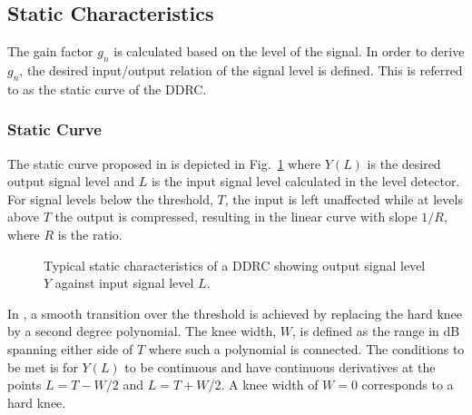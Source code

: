 \documentclass[../main2.tex]{subfiles}
\providecommand{\rootdir}{..}
\begin{document}
\FloatBarrier
\subsection{Static Characteristics}
The gain factor $g_n$ is calculated based on the level of the signal. In order to derive $g_n$, the desired input/output relation of the signal level is defined. This is referred to as the static curve of the DDRC.

\subsubsection{Static Curve}
The static curve proposed in \cite{mcnally1984dynamic, stikvoort1986digital, frindle1996implementation, reiss2012tutorial} is depicted in Fig.~\ref{fig:typical_static_detailed} where $Y(L)$ is the desired output signal level and $L$ is the input signal level calculated in the level detector. For signal levels below the threshold, $T$, the input is left unaffected while at levels above $T$ the output is compressed, resulting in the linear curve with slope $1/R$, where $R$ is the ratio.

\begin{figure}
\centerline{}
\caption{Typical static characteristics of a DDRC showing output signal level $Y$ against input signal level $L$.}
\label{fig:typical_static_detailed}
\end{figure}

In \cite{frindle1996implementation}\cite{reiss2012tutorial}, a smooth transition over the threshold is achieved by replacing the hard knee by a second degree polynomial. The knee width, $W$, is defined as the range in dB spanning either side of $T$ where such a polynomial is connected. The conditions to be met is for $Y(L)$ to be continuous and have continuous derivatives at the points $L=T-W/2$ and $L=T+W/2$. A knee width of $W=0$ corresponds to a hard knee. 
\end{document}
